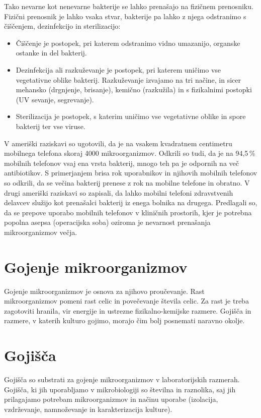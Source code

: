 \documentclass[12pt, a4paper, oneside]{report}
\begin{document}
Tako nevarne kot nenevarne bakterije se lahko prenašajo na fizičnem prenosniku. Fizični prenosnik je lahko vsaka stvar, bakterije pa lahko z njega odstranimo s čiščenjem, dezinfekcijo in sterilizacijo:
\begin{itemize}
\item Čiščenje je postopek, pri katerem odstranimo vidno umazanijo, organske ostanke in del bakterij.
\item Dezinfekcija ali razkuževanje je postopek, pri katerem uničimo vse vegetativne oblike bakterij. Razkuževanje izvajamo na tri načine, in sicer mehansko (drgnjenje, brisanje), kemično (razkužila) in s fizikalnimi postopki (UV sevanje, segrevanje).
\item Sterilizacija je postopek, s katerim uničimo vse vegetativne oblike in spore bakterij ter vse viruse.
\end{itemize}

V ameriški raziskavi so ugotovili, da je na vsakem kvadratnem centimetru mobilnega telefona skoraj 4000 mikroorganizmov. Odkrili so tudi, da je na 94,5\,\% mobilnih telefonov vsaj ena vrsta bakterij, mnogo teh pa je odpornih na več antibiotikov. S primerjanjem brisa rok uporabnikov in njihovih mobilnih telefonov so odkrili, da se večina bakterij prenese z rok na mobilne telefone in obratno. V drugi ameriški raziskavi so zapisali, da lahko mobilni telefoni zdravstvenih delavcev služijo kot prenašalci bakterij iz enega bolnika na drugega. Predlagali so, da se prepove uporabo mobilnih telefonov v kliničnih prostorih, kjer je potrebna popolna asepsa (operacijska soba) oziroma je nevarnost prenašanja mikroorganizmov večja.

\section{Gojenje mikroorganizmov}

Gojenje mikroorganizmov je osnova za njihovo proučevanje. Rast mikroorganizmov pomeni rast celic in povečevanje števila celic. Za rast je treba zagotoviti hranila, vir energije in ustrezne fizikalno-kemijske razmere. Gojišča in razmere, v katerih kulturo gojimo, morajo čim bolj posnemati naravno okolje.

\section{Gojišča}

Gojišča so substrati za gojenje mikroorganizmov v laboratorijskih razmerah. Gojišča, ki jih uporabljamo v mikrobiologiji so številna in raznolika, saj jih prilagajamo potrebam mikroorganizmov in načinu uporabe (izolacija, vzdrževanje, namnoževanje in karakterizacija kulture).
\end{document}
